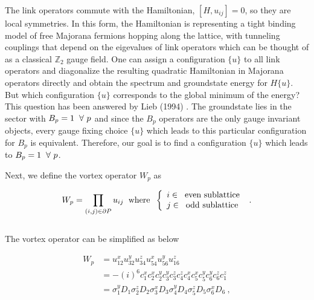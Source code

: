 \documentclass{article}
\begin{document}
The link operators commute with the Hamiltonian, $[H, u_{ij}] = 0$, so they are local symmetries. In this form, the Hamiltonian is representing a tight binding model of free Majorana fermions hopping along the lattice, with tunneling couplings that depend on the eigevalues of link operators which can be thought of as a classical $\mathbb{Z}_2$ gauge field. One can assign a configuration $\{u\}$ to all link operators and diagonalize the resulting quadratic Hamiltonian in Majorana operators directly and obtain the spectrum and groundstate energy for $H\{u\}$. But which configuration $\{u\}$ corresponds to the global minimum of the energy? This question has been answered by Lieb (1994) \cite{kour2014real}. The groundstate lies in the sector with $B_p = 1 \hspace{2mm} \forall ~p$ and since the $B_p$ operators are the only gauge invariant objects, every gauge fixing choice $\{u\}$ which leads to this particular configuration for $B_p$ is equivalent. Therefore, our goal is to find a configuration $\{u\}$ which leads to $B_p = 1 \hspace{2mm} \forall ~p$. 

Next, we define the vortex operator $W_p$ as

\begin{equation}\label{eq:26}
	\begin{aligned}
		W_p = \prod_{(i,j)\in \partial P} u_{ij} \hspace{2mm}\text{where}\hspace{2mm}
		\left\{
		\begin{array}{l}
            i  \in \hspace{2mm} \text{even sublattice} \\
            j  \in \hspace{2mm} \text{odd sublattice}
        \end{array}
        \right.~.
	\end{aligned}
\end{equation}\\

The vortex operator can be simplified as below

\begin{equation}\label{eq:27}
	\begin{aligned}
		W_p &= u^x_{12}u^y_{32}u^z_{34}u^x_{54}u^y_{56}u^z_{16} \\
		&= -(i)^6 c^x_1 c^x_2 c^y_2 c^y_3 c^z_3 c^z_4 c^x_4 c^x_5 c^y_5 c^y_6 c^z_6 c^z_1 \\
		&= \sigma^y_1 D_1 \sigma^z_2 D_2 \sigma^x_3 D_3 \sigma^y_4 D_4 \sigma^z_5 D_5 \sigma^x_6 D_6 ~,
	\end{aligned}
\end{equation}\\
\end{document}
